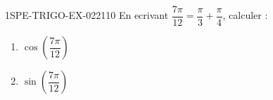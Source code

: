 \begin{exercice}{1SPE-TRIGO-EX-022}{1}{10}
En ecrivant $\dfrac{7\pi}{12} = \dfrac{\pi}{3} + \dfrac{\pi}{4}$, calculer :
\begin{enumerate}
  \item $\cos\!\left(\dfrac{7\pi}{12}\right)$
  \item $\sin\!\left(\dfrac{7\pi}{12}\right)$
\end{enumerate}
\end{exercice}
